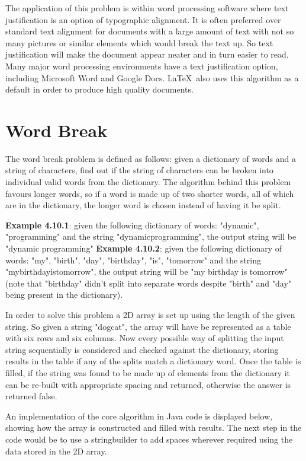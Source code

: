 The application of this problem is within word processing software where text justification is an option of typographic alignment. It is often preferred over standard text alignment for documents with a large amount of text with not so many pictures or similar elements which would break the text up. So text justification will make the document appear neater and in turn easier to read. Many major word processing environments have a text justification option, including Microsoft Word and Google Docs. \LaTeX\ also uses this algorithm as a default in order to produce high quality documents.




\section{Word Break}
The word break problem is defined as follows: given a dictionary of words and a string of characters, find out if the string of characters can be broken into individual valid words from the dictionary. The algorithm behind this problem favours longer words, so if a word is made up of two shorter words, all of which are in the dictionary, the longer word is chosen instead of having it be split.

\medbreak
\textbf{Example 4.10.1}: given the following dictionary of words: {"dynamic", "programming"} and the string "dynamicprogramming", the output string will be "dynamic programming"
\smallbreak
\textbf{Example 4.10.2}: given the following dictionary of words: {"my", "birth", "day", "birthday", "is", "tomorrow"} and the string "mybirthdayistomorrow", the output string will be "my birthday is tomorrow" (note that "birthday" didn't split into separate words despite "birth" and "day" being present in the dictionary).

\smallbreak\noindent
In order to solve this problem a 2D array is set up using the length of the given string. So given a string "dogcat", the array will have be represented as a table with six rows and six columns. Now every possible way of splitting the input string sequentially is considered and checked against the dictionary, storing results in the table if any of the splits match a dictionary word. Once the table is filled, if the string was found to be made up of elements from the dictionary it can be re-built with appropriate spacing and returned, otherwise the answer is returned false.

\smallbreak\noindent
An implementation of the core algorithm in Java code is displayed below, showing how the array is constructed and filled with results. The next step in the code would be to use a stringbuilder to add spaces wherever required using the data stored in the 2D array.

